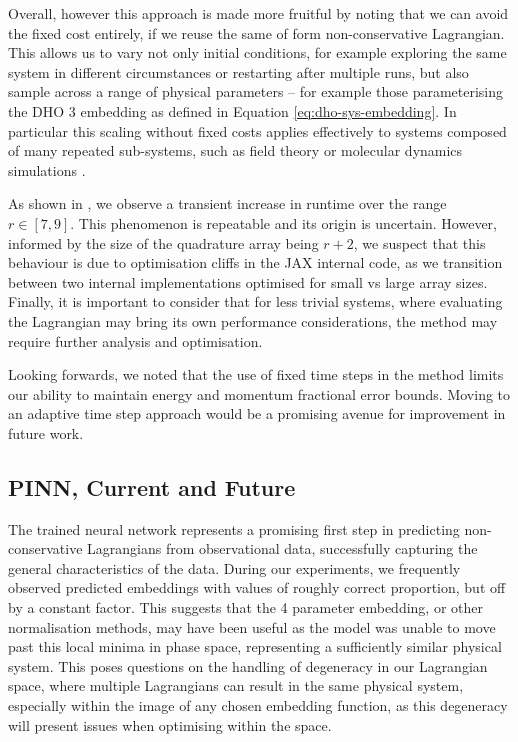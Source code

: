 Overall, however this approach is made more fruitful by noting that we can avoid the fixed cost entirely, if we reuse the same of form non-conservative Lagrangian.
This allows us to vary not only initial conditions, for example exploring the same system in different circumstances or restarting after multiple runs, but also sample across a range of physical parameters -- for example those parameterising the DHO 3 embedding as defined in Equation \eqref{eq:dho-sys-embedding}.
In particular this scaling without fixed costs applies effectively to systems composed of many repeated sub-systems, such as field theory or molecular dynamics simulations \cite{tuckermanUnderstandingModernMolecular2000b}.

As shown in , we observe a transient increase in runtime over the range $r \in [7, 9]$. This phenomenon is repeatable and its origin is uncertain. However, informed by the size of the quadrature array being $r + 2$, we suspect that this behaviour is due to optimisation cliffs in the JAX internal code, as we transition between two internal implementations optimised for small vs large array sizes. Finally, it is important to consider that for less trivial systems, where evaluating the Lagrangian may bring its own performance considerations, the method may require further analysis and optimisation.

Looking forwards, we noted that the use of fixed time steps in the method limits our ability to maintain energy and momentum fractional error bounds. Moving to an adaptive time step approach would be a promising avenue for improvement in future work.

\subsection{PINN, Current and Future}

The trained neural network represents a promising first step in predicting non-conservative Lagrangians from observational data, successfully capturing the general characteristics of the data.
During our experiments, we frequently observed predicted embeddings with values of roughly correct proportion, but off by a constant factor.
This suggests that the 4 parameter embedding, or other normalisation methods, may have been useful as the model was unable to move past this local minima in phase space, representing a sufficiently similar physical system.
This poses questions on the handling of degeneracy in our Lagrangian space, where multiple Lagrangians can result in the same physical system, especially within the image of any chosen embedding function, as this degeneracy will present issues when optimising within the space.


